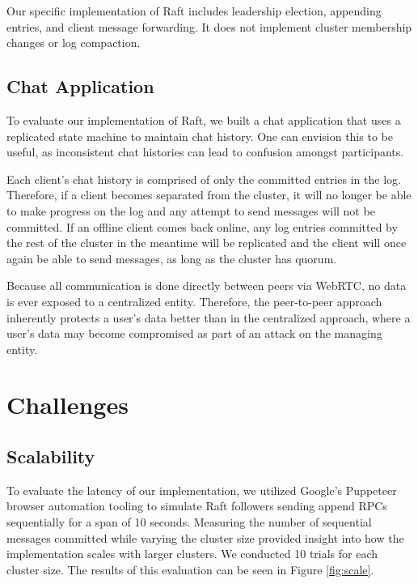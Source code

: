 \documentclass[11pt,twocolumn]{article}
\begin{document}
Our specific implementation of Raft includes leadership election, appending entries, and client message forwarding. It does not implement cluster membership changes or log compaction.

\subsection{Chat Application}
To evaluate our implementation of Raft, we built a chat application that uses a replicated state machine to maintain chat history. One can envision this to be useful, as inconsistent chat histories can lead to confusion amongst participants.

Each client's chat history is comprised of only the committed entries in the log. Therefore, if a client becomes separated from the cluster, it will no longer be able to make progress on the log and any attempt to send messages will not be committed. If an offline client comes back online, any log entries committed by the rest of the cluster in the meantime will be replicated and the client will once again be able to send messages, as long as the cluster has quorum.

Because all communication is done directly between peers via WebRTC, no data is ever exposed to a centralized entity. Therefore, the peer-to-peer approach inherently protects a user's data better than in the centralized approach, where a user's data may become compromised as part of an attack on the managing entity.

\section{Challenges}

\subsection{Scalability}
To evaluate the latency of our implementation, we utilized Google's Puppeteer \cite{puppeteerwebsite} browser automation tooling to simulate Raft followers sending append RPCs sequentially for a span of 10 seconds. Measuring the number of sequential messages committed while varying the cluster size provided insight into how the implementation scales with larger clusters. We conducted 10 trials for each cluster size. The results of this evaluation can be seen in Figure \ref{fig:scale}.
\end{document}
